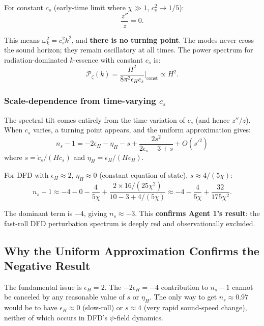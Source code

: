 \documentclass[11pt,a4paper]{article}
\begin{document}
For constant $c_s$ (early-time limit where $\chi \gg 1$, $c_s^2 \to 1/5$):
\begin{equation}
\frac{z''}{z} = 0.
\end{equation}

This means $\omega_k^2 = c_s^2 k^2$, and \textbf{there is no turning point}. The modes never cross the sound horizon; they remain oscillatory at all times. The power spectrum for radiation-dominated $k$-essence with constant $c_s$ is:
\begin{equation}
\mathcal{P}_\zeta(k) = \frac{H^2}{8\pi^2 \epsilon_H c_s} \bigg|_{\text{const}} \propto H^2.
\end{equation}

\subsubsection{Scale-dependence from time-varying $c_s$}

The spectral tilt comes entirely from the time-variation of $c_s$ (and hence $z''/z$). When $c_s$ varies, a turning point appears, and the uniform approximation gives:
\begin{equation}
n_s - 1 = -2\epsilon_H - \eta_H - s + \frac{2s^2}{2\epsilon_s - 3 + s} + O(s'^2)
\end{equation}
where $s = \dot{c}_s/(Hc_s)$ and $\eta_H = \dot\epsilon_H/(H\epsilon_H)$.

For DFD with $\epsilon_H \approx 2$, $\eta_H \approx 0$ (constant equation of state), $s \approx 4/(5\chi)$:
\begin{equation}
n_s - 1 \approx -4 - 0 - \frac{4}{5\chi} + \frac{2 \times 16/(25\chi^2)}{10 - 3 + 4/(5\chi)} \approx -4 - \frac{4}{5\chi} + \frac{32}{175\chi^2}.
\end{equation}

The dominant term is $-4$, giving $n_s \approx -3$. This \textbf{confirms Agent 1's result}: the fast-roll DFD perturbation spectrum is deeply red and observationally excluded.

\subsection{Why the Uniform Approximation Confirms the Negative Result}

The fundamental issue is $\epsilon_H = 2$. The $-2\epsilon_H = -4$ contribution to $n_s - 1$ cannot be canceled by any reasonable value of $s$ or $\eta_H$. The only way to get $n_s \approx 0.97$ would be to have $\epsilon_H \approx 0$ (slow-roll) or $s \approx 4$ (very rapid sound-speed change), neither of which occurs in DFD's $\psi$-field dynamics.
\end{document}
